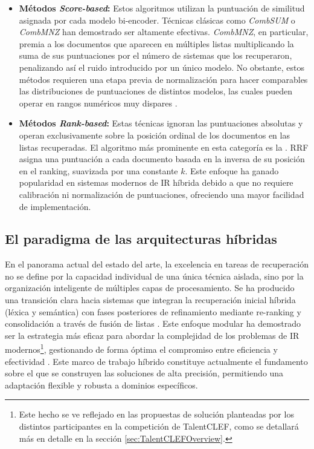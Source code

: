 \begin{itemize}
    \item \textbf{Métodos \textit{Score-based}:} Estos algoritmos utilizan la puntuación de similitud asignada por cada modelo bi-encoder. Técnicas clásicas como \textit{CombSUM} o \textit{CombMNZ} \cite{fox1994combination} han demostrado ser altamente efectivas. \textit{CombMNZ}, en particular, premia a los documentos que aparecen en múltiples listas multiplicando la suma de sus puntuaciones por el número de sistemas que los recuperaron, penalizando así el ruido introducido por un único modelo. No obstante, estos métodos requieren una etapa previa de normalización para hacer comparables las distribuciones de puntuaciones de distintos modelos, las cuales pueden operar en rangos numéricos muy dispares \cite{wu2006evaluating}.
          
    \item \textbf{Métodos \textit{Rank-based}:} Estas técnicas ignoran las puntuaciones absolutas y operan exclusivamente sobre la posición ordinal de los documentos en las listas recuperadas. El algoritmo más prominente en esta categoría es la  \cite{cormack2009reciprocal}. \gls{RRF} asigna una puntuación a cada documento basada en la inversa de su posición en el ranking, suavizada por una constante $k$. Este enfoque ha ganado popularidad en sistemas modernos de \gls{IR} híbrida debido a que no requiere calibración ni normalización de puntuaciones, ofreciendo una mayor facilidad de implementación.
\end{itemize}


\subsection{El paradigma de las arquitecturas híbridas}

\noindent En el panorama actual del estado del arte, la excelencia en tareas de recuperación no se define por la capacidad individual de una única técnica aislada, sino por la organización inteligente de múltiples capas de procesamiento. Se ha producido una transición clara hacia sistemas que integran la recuperación inicial híbrida (léxica y semántica) con fases posteriores de refinamiento mediante re-ranking y consolidación a través de fusión de listas \cite{zhang2022hlatr}. Este enfoque modular ha demostrado ser la estrategia más eficaz para abordar la complejidad de los problemas de \gls{IR} modernos\footnote{Este hecho se ve reflejado en las propuestas de solución planteadas por los distintos participantes en la competición de TalentCLEF, como se detallará más en detalle en la sección \ref{sec:TalentCLEFOverview}.}, gestionando de forma óptima el compromiso entre eficiencia y efectividad \cite{bruch2023analysis}. Este marco de trabajo híbrido constituye actualmente el fundamento sobre el que se construyen las soluciones de alta precisión, permitiendo una adaptación flexible y robusta a dominios específicos.

